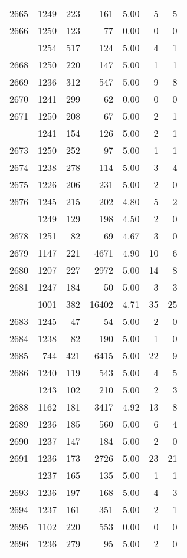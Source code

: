 \documentclass[
]{article}
\begin{document}
\begin{table}
\begin{tabular}[t]{lrrrrrr}
2665 & 1249 & 223 & 161 & 5.00 & 5 & 5\\
2666 & 1250 & 123 & 77 & 0.00 & 0 & 0\\
\addlinespace
2667 & 1254 & 517 & 124 & 5.00 & 4 & 1\\
2668 & 1250 & 220 & 147 & 5.00 & 1 & 1\\
2669 & 1236 & 312 & 547 & 5.00 & 9 & 8\\
2670 & 1241 & 299 & 62 & 0.00 & 0 & 0\\
2671 & 1250 & 208 & 67 & 5.00 & 2 & 1\\
\addlinespace
2672 & 1241 & 154 & 126 & 5.00 & 2 & 1\\
2673 & 1250 & 252 & 97 & 5.00 & 1 & 1\\
2674 & 1238 & 278 & 114 & 5.00 & 3 & 4\\
2675 & 1226 & 206 & 231 & 5.00 & 2 & 0\\
2676 & 1245 & 215 & 202 & 4.80 & 5 & 2\\
\addlinespace
2677 & 1249 & 129 & 198 & 4.50 & 2 & 0\\
2678 & 1251 & 82 & 69 & 4.67 & 3 & 0\\
2679 & 1147 & 221 & 4671 & 4.90 & 10 & 6\\
2680 & 1207 & 227 & 2972 & 5.00 & 14 & 8\\
2681 & 1247 & 184 & 50 & 5.00 & 3 & 3\\
\addlinespace
2682 & 1001 & 382 & 16402 & 4.71 & 35 & 25\\
2683 & 1245 & 47 & 54 & 5.00 & 2 & 0\\
2684 & 1238 & 82 & 190 & 5.00 & 1 & 0\\
2685 & 744 & 421 & 6415 & 5.00 & 22 & 9\\
2686 & 1240 & 119 & 543 & 5.00 & 4 & 5\\
\addlinespace
2687 & 1243 & 102 & 210 & 5.00 & 2 & 3\\
2688 & 1162 & 181 & 3417 & 4.92 & 13 & 8\\
2689 & 1236 & 185 & 560 & 5.00 & 6 & 4\\
2690 & 1237 & 147 & 184 & 5.00 & 2 & 0\\
2691 & 1236 & 173 & 2726 & 5.00 & 23 & 21\\
\addlinespace
2692 & 1237 & 165 & 135 & 5.00 & 1 & 1\\
2693 & 1236 & 197 & 168 & 5.00 & 4 & 3\\
2694 & 1237 & 161 & 351 & 5.00 & 2 & 1\\
2695 & 1102 & 220 & 553 & 0.00 & 0 & 0\\
2696 & 1236 & 279 & 95 & 5.00 & 2 & 0\\

\end{tabular}
\end{table}
\end{document}
